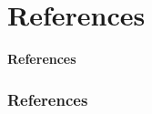\section{References}
\begin{frame}
    \begin{center}
        \Huge \textcolor{NavyBlue}{\textbf{References}}
    \end{center}
\end{frame}

\begin{frame}
    \frametitle{References}
    \nocite{*}
    
    
\end{frame}